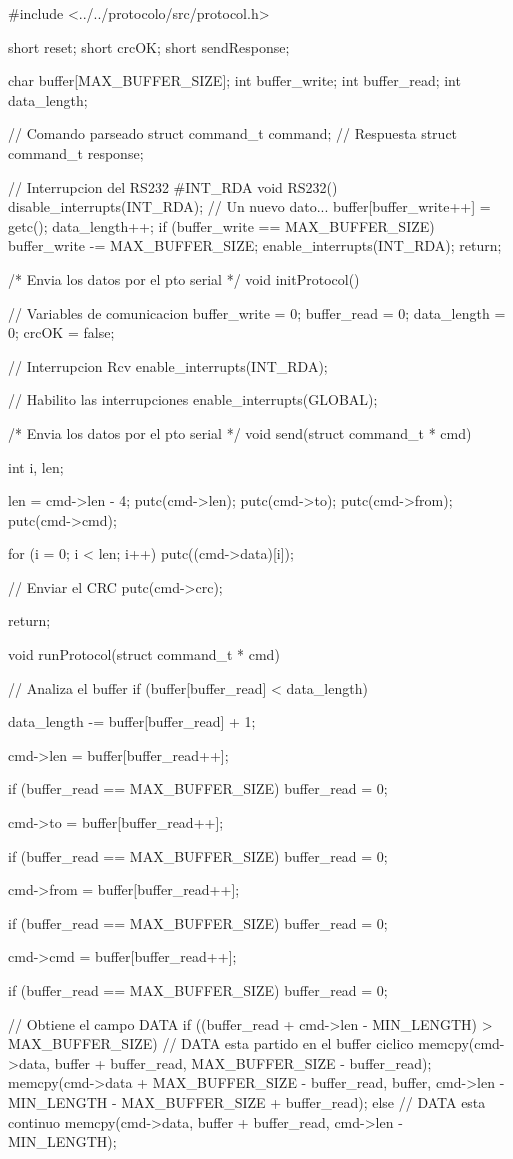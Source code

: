 {\scriptsize
\begin{verbatimtab}
#include <../../protocolo/src/protocol.h>

short reset;
short crcOK;
short sendResponse;

char buffer[MAX_BUFFER_SIZE];
int buffer_write;
int buffer_read;
int data_length;

// Comando parseado
struct command_t command;
// Respuesta
struct command_t response;

// Interrupcion del RS232
#INT_RDA
void RS232()
{
	disable_interrupts(INT_RDA);
	// Un nuevo dato...
	buffer[buffer_write++] = getc();
	data_length++;
	if (buffer_write == MAX_BUFFER_SIZE)
		buffer_write -= MAX_BUFFER_SIZE;
	enable_interrupts(INT_RDA);
	return;
}

/* Envia los datos por el pto serial */
void initProtocol()
{
	// Variables de comunicacion
	buffer_write = 0;
	buffer_read = 0;
	data_length = 0;
	crcOK = false;
	
	// Interrupcion Rcv
	enable_interrupts(INT_RDA);

	// Habilito las interrupciones
	enable_interrupts(GLOBAL);
}

/* Envia los datos por el pto serial */
void send(struct command_t * cmd)
{
	int i, len;
	
	len = cmd->len - 4;
	putc(cmd->len);
	putc(cmd->to);
	putc(cmd->from);
	putc(cmd->cmd);
	
	for (i = 0; i < len; i++)
	{
		putc((cmd->data)[i]);
	}
	
	// Enviar el CRC
	putc(cmd->crc);
	
	return;	
}	

void runProtocol(struct command_t * cmd)
{
	// Analiza el buffer
	if (buffer[buffer_read] < data_length)
	{
		data_length -= buffer[buffer_read] + 1;
	
		cmd->len = buffer[buffer_read++];
	
		if (buffer_read == MAX_BUFFER_SIZE)
			buffer_read = 0;
	
		cmd->to = buffer[buffer_read++];
	
		if (buffer_read == MAX_BUFFER_SIZE)
			buffer_read = 0;
	
		cmd->from = buffer[buffer_read++];
	
		if (buffer_read == MAX_BUFFER_SIZE)
			buffer_read = 0;
	
		cmd->cmd = buffer[buffer_read++];
	
		if (buffer_read == MAX_BUFFER_SIZE)
			buffer_read = 0;
	
		// Obtiene el campo DATA
		if ((buffer_read + cmd->len - MIN_LENGTH) > MAX_BUFFER_SIZE)
		{
			// DATA esta partido en el buffer ciclico
			memcpy(cmd->data, buffer + buffer_read, MAX_BUFFER_SIZE - buffer_read);
			memcpy(cmd->data + MAX_BUFFER_SIZE - buffer_read, buffer, 
				cmd->len - MIN_LENGTH - MAX_BUFFER_SIZE + buffer_read);
		} else {
			// DATA esta continuo
			memcpy(cmd->data, buffer + buffer_read, cmd->len - MIN_LENGTH);
		}
	
}}
\end{verbatimtab}}
